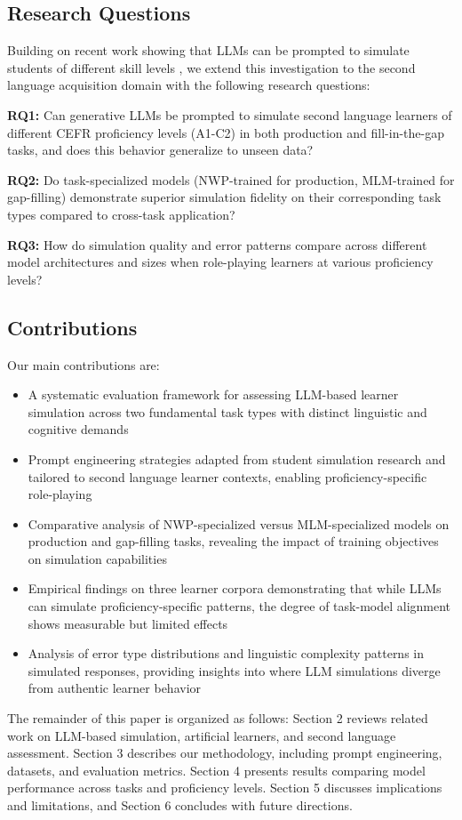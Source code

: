 \subsection{Research Questions}

Building on recent work showing that LLMs can be prompted to simulate students of different skill levels \cite{benedetto2024using}, we extend this investigation to the second language acquisition domain with the following research questions:

\textbf{RQ1:} Can generative LLMs be prompted to simulate second language learners of different CEFR proficiency levels (A1-C2) in both production and fill-in-the-gap tasks, and does this behavior generalize to unseen data?

\textbf{RQ2:} Do task-specialized models (NWP-trained for production, MLM-trained for gap-filling) demonstrate superior simulation fidelity on their corresponding task types compared to cross-task application?

\textbf{RQ3:} How do simulation quality and error patterns compare across different model architectures and sizes when role-playing learners at various proficiency levels?

\subsection{Contributions}

Our main contributions are:

\begin{itemize}
    \item A systematic evaluation framework for assessing LLM-based learner simulation across two fundamental task types with distinct linguistic and cognitive demands
    \item Prompt engineering strategies adapted from student simulation research \cite{benedetto2024using} and tailored to second language learner contexts, enabling proficiency-specific role-playing
    \item Comparative analysis of NWP-specialized versus MLM-specialized models on production and gap-filling tasks, revealing the impact of training objectives on simulation capabilities
    \item Empirical findings on three learner corpora demonstrating that while LLMs can simulate proficiency-specific patterns, the degree of task-model alignment shows measurable but limited effects
    \item Analysis of error type distributions and linguistic complexity patterns in simulated responses, providing insights into where LLM simulations diverge from authentic learner behavior
\end{itemize}

The remainder of this paper is organized as follows: Section 2 reviews related work on LLM-based simulation, artificial learners, and second language assessment. Section 3 describes our methodology, including prompt engineering, datasets, and evaluation metrics. Section 4 presents results comparing model performance across tasks and proficiency levels. Section 5 discusses implications and limitations, and Section 6 concludes with future directions.
